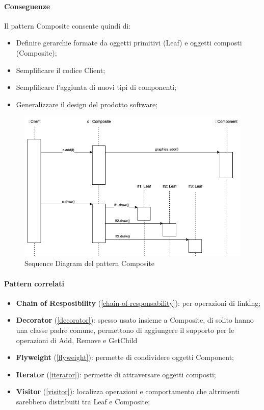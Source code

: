 \paragraph{Conseguenze} Il pattern Composite consente quindi di:
\begin{itemize}
    \item Definire gerarchie formate da oggetti primitivi (Leaf) e oggetti composti (Composite);
    \item Semplificare il codice Client;
    \item Semplificare l'aggiunta di nuovi tipi di componenti;
    \item Generalizzare il design del prodotto software;
\end{itemize}

\begin{figure}[H]
    \centering
    \includegraphics[width=0.75\linewidth]{assets/pattern/composite/composite-sequence.drawio.png}
    \caption{Sequence Diagram del pattern Composite}
\end{figure}

\paragraph{Pattern correlati}
\begin{itemize}
    \item \textbf{Chain of Resposibility} (\ref{chain-of-responsability}): per operazioni di linking;
    \item \textbf{Decorator} (\ref{decorator}): spesso usato insieme a Composite, di solito hanno una classe padre comune, permettono di aggiungere il supporto per le operazioni di Add, Remove e GetChild
    \item \textbf{Flyweight} (\ref{flyweight}): permette di condividere oggetti Component;
    \item \textbf{Iterator} (\ref{iterator}): permette di attraversare oggetti composti;
    \item \textbf{Visitor} (\ref{visitor}): localizza operazioni e comportamento che altrimenti sarebbero distribuiti tra Leaf e Composite;
\end{itemize}

\newpage